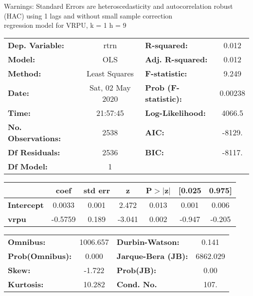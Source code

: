 Warnings: \newline
 [1] Standard Errors are heteroscedasticity and autocorrelation robust (HAC) using 1 lags and without small sample correction\\ 

regression model for VRPU, k = 1 h = 9\begin{center}
\begin{tabular}{lclc}
\toprule
\textbf{Dep. Variable:}    &       rtrn       & \textbf{  R-squared:         } &     0.012   \\
\textbf{Model:}            &       OLS        & \textbf{  Adj. R-squared:    } &     0.012   \\
\textbf{Method:}           &  Least Squares   & \textbf{  F-statistic:       } &     9.249   \\
\textbf{Date:}             & Sat, 02 May 2020 & \textbf{  Prob (F-statistic):} &  0.00238    \\
\textbf{Time:}             &     21:57:45     & \textbf{  Log-Likelihood:    } &    4066.5   \\
\textbf{No. Observations:} &        2538      & \textbf{  AIC:               } &    -8129.   \\
\textbf{Df Residuals:}     &        2536      & \textbf{  BIC:               } &    -8117.   \\
\textbf{Df Model:}         &           1      & \textbf{                     } &             \\
\bottomrule
\end{tabular}
\begin{tabular}{lcccccc}
                   & \textbf{coef} & \textbf{std err} & \textbf{z} & \textbf{P$> |$z$|$} & \textbf{[0.025} & \textbf{0.975]}  \\
\midrule
\textbf{Intercept} &       0.0033  &        0.001     &     2.472  &         0.013        &        0.001    &        0.006     \\
\textbf{vrpu}      &      -0.5759  &        0.189     &    -3.041  &         0.002        &       -0.947    &       -0.205     \\
\bottomrule
\end{tabular}
\begin{tabular}{lclc}
\textbf{Omnibus:}       & 1006.657 & \textbf{  Durbin-Watson:     } &    0.141  \\
\textbf{Prob(Omnibus):} &   0.000  & \textbf{  Jarque-Bera (JB):  } & 6862.029  \\
\textbf{Skew:}          &  -1.722  & \textbf{  Prob(JB):          } &     0.00  \\
\textbf{Kurtosis:}      &  10.282  & \textbf{  Cond. No.          } &     107.  \\
\bottomrule
\end{tabular}
\end{center}

